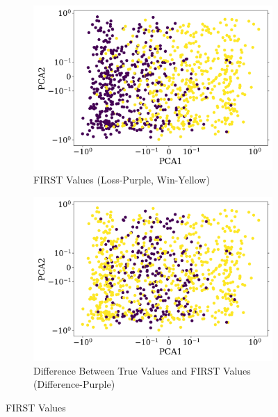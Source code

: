 \documentclass{article}
\begin{document}
\begin{figure}[H]
    \centering
    \begin{subfigure}[t]{0.495\textwidth}
        \centering
        \includegraphics[width=\textwidth]{results/GaussianNB_FIRST_Week_6_With_RS_True.png}
        \caption{FIRST Values (Loss-Purple, Win-Yellow)}
        \label{fig:first_values}
    \end{subfigure}
    \hfill
    \begin{subfigure}[t]{0.495\textwidth}
        \centering
        \includegraphics[width=\textwidth]{results/GaussianNB_Diff_FIRST_True_Week_6_With_RS_True.png}
        \caption{Difference Between True Values and FIRST Values (Difference-Purple)}
        \label{fig:diff_first_true}
    \end{subfigure}
    \caption{FIRST Values}
    \label{fig:first_values_fig}
\end{figure}
\end{document}
